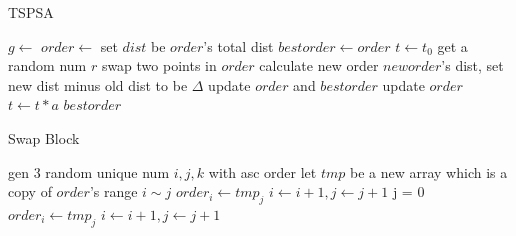 \documentclass[UTF8,a4paper]{ctexart}
\begin{document}
\begin{algorithm}
    \caption{TSPSA}\label{algotspsa}
    \begin{algorithmic}[1] %
        \State $g\gets$
        \State $order\gets$
        \State set $dist$ be $order$'s total dist
        \State $bestorder\gets order$
        \State $t\gets t_0$
        \Repeat
        \State get a random num $r$
        \State swap two points in $order$
        \Else
        \State {}
        \EndIf
        \State calculate new order $neworder$'s dist, set new dist minus old dist to be $\Delta$
        \State update $order$ and $bestorder$
        \State update $order$
        \EndIf
        \EndFor
        \State $t\gets t*a$
        \State \Return $bestorder$
        \EndFunction
    \end{algorithmic}
\end{algorithm}

\begin{algorithm}
    \caption{Swap Block}\label{algoswapblock}
    \begin{algorithmic}[1] %
        \State gen 3 random unique num $i,j,k$ with asc order
        \State let $tmp$ be a new array which is a copy of $order$'s range $i\sim j$
        \State $order_i\gets tmp_j$
        \State $i\gets i+1,j\gets j+1$
        \EndWhile
        \State j = 0
        \State $order_i\gets tmp_j$
        \State $i\gets i+1,j\gets j+1$
        \EndWhile
        \EndFunction
    \end{algorithmic}
\end{algorithm}
\end{document}
